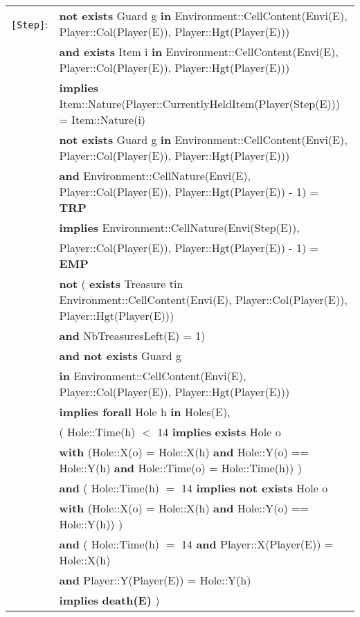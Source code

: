 \documentclass[7pt]{article}
\begin{document}
\begin{tabular}{rl}

   \texttt{[Step]}:& \textbf{not exists} Guard g \textbf{in} Environment::CellContent(Envi(E), Player::Col(Player(E)), Player::Hgt(Player(E)))\\
& \quad \textbf{and exists} Item i \textbf{in} Environment::CellContent(Envi(E), Player::Col(Player(E)), Player::Hgt(Player(E)))\\
& \quad \textbf{implies} Item::Nature(Player::CurrentlyHeldItem(Player(Step(E))) = Item::Nature(i) \\

& \textbf{not exists} Guard g \textbf{in} Environment::CellContent(Envi(E), Player::Col(Player(E)), Player::Hgt(Player(E)))\\
& \quad \textbf{and} Environment::CellNature(Envi(E), Player::Col(Player(E)), Player::Hgt(Player(E)) - 1) = \textbf{TRP}\\
& \quad \textbf{implies} Environment::CellNature(Envi(Step(E)),  \\
& \quad\quad\quad\quad Player::Col(Player(E)), Player::Hgt(Player(E)) - 1) = \textbf{EMP}\\

& \textbf{not} ( \textbf{exists} Treasure t{in} Environment::CellContent(Envi(E), Player::Col(Player(E)), Player::Hgt(Player(E)))\\
& \quad\quad\quad \textbf{and} NbTreasuresLeft(E) = 1) \\
& \quad \textbf{and not exists} Guard g  \\
& \quad\quad \textbf{in} Environment::CellContent(Envi(E), Player::Col(Player(E)), Player::Hgt(Player(E)))\\
& \quad \textbf{implies forall} Hole h \textbf{in} Holes(E), \\
& \quad\quad ( Hole::Time(h) $<$ 14 \textbf{implies} \textbf{exists} Hole o \\
& \quad\quad\quad \textbf{with} (Hole::X(o) = Hole::X(h) \textbf{and} Hole::Y(o) == Hole::Y(h) \textbf{and} Hole::Time(o) = Hole::Time(h)) ) \\
& \quad\quad \textbf{and} ( Hole::Time(h) $=$ 14 \textbf{implies} \textbf{not exists} Hole o \\
& \quad\quad\quad \textbf{with} (Hole::X(o) = Hole::X(h) \textbf{and} Hole::Y(o) == Hole::Y(h)) ) \\
& \quad\quad \textbf{and} ( Hole::Time(h) $=$ 14 \textbf{and} Player::X(Player(E)) = Hole::X(h) \\
& \quad\quad\quad \textbf{and} Player::Y(Player(E))  = Hole::Y(h) \\
& \quad\quad\quad \textbf{implies} \textbf{death(E)} ) \\


\end{tabular}
\end{document}
